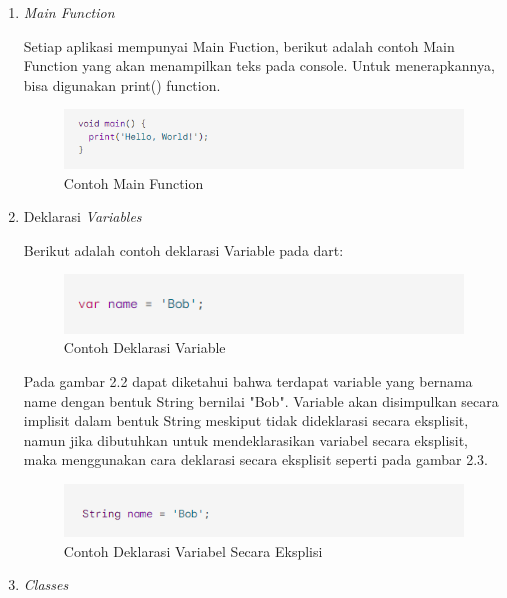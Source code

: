 \begin{enumerate}
	\item \textit{Main Function}

	Setiap aplikasi mempunyai Main Fuction, berikut adalah contoh Main Function yang akan menampilkan teks pada console. Untuk menerapkannya, bisa digunakan print() function.
	
	\begin{figure}[H]
		\centering
		\includegraphics[keepaspectratio, width=12cm]{gambar/helloworld}
		\caption{Contoh Main Function}
		\label{gambar:main}
	\end{figure}
	
	\item Deklarasi \textit{Variables}

	Berikut adalah contoh deklarasi Variable pada dart:
	\begin{figure}[H]
		\centering
		\includegraphics[keepaspectratio, width=12cm]{gambar/implisitvar}
		\caption{Contoh Deklarasi Variable}
		\label{gambar:deklarasivariable}
	\end{figure}
	Pada gambar 2.2 dapat diketahui bahwa terdapat variable yang bernama name dengan bentuk String bernilai "Bob". Variable akan disimpulkan secara implisit dalam bentuk String meskiput tidak dideklarasi secara eksplisit, namun jika dibutuhkan untuk mendeklarasikan variabel secara eksplisit, maka menggunakan cara deklarasi secara eksplisit seperti pada gambar 2.3.
	\begin{figure}[H]
		\centering
		\includegraphics[keepaspectratio, width=12cm]{gambar/eksplisitvar}
		\caption{Contoh Deklarasi Variabel Secara Eksplisi}
		\label{gambar:deklarasivariableeksplisit}
	\end{figure}
	
	\item\textit{Classes}


\end{enumerate}
